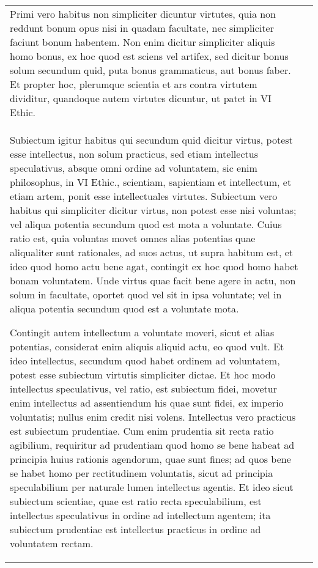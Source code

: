 \documentclass[10pt]{jsarticle}
\begin{document}
\begin{longtable}{p{21em}p{21em}}
\\

Primi vero habitus non simpliciter
dicuntur virtutes, quia non reddunt bonum opus nisi in quadam
facultate, nec simpliciter faciunt bonum habentem. Non enim dicitur
simpliciter aliquis homo bonus, ex hoc quod est sciens vel artifex,
sed dicitur bonus solum secundum quid, puta bonus grammaticus, aut
bonus faber. Et propter hoc, plerumque scientia et ars contra virtutem
dividitur, quandoque autem virtutes dicuntur, ut patet in VI
Ethic. 

&


\\


Subiectum igitur habitus qui secundum quid dicitur virtus, potest esse
intellectus, non solum practicus, sed etiam intellectus speculativus,
absque omni ordine ad voluntatem, sic enim philosophus, in VI Ethic.,
scientiam, sapientiam et intellectum, et etiam artem, ponit esse
intellectuales virtutes. Subiectum vero habitus qui simpliciter
dicitur virtus, non potest esse nisi voluntas; vel aliqua potentia
secundum quod est mota a voluntate. Cuius ratio est, quia voluntas
movet omnes alias potentias quae aliqualiter sunt rationales, ad suos
actus, ut supra habitum est, et ideo quod homo actu bene agat,
contingit ex hoc quod homo habet bonam voluntatem. Unde virtus quae
facit bene agere in actu, non solum in facultate, oportet quod vel sit
in ipsa voluntate; vel in aliqua potentia secundum quod est a
voluntate mota.


Contingit autem intellectum a voluntate moveri, sicut
et alias potentias, considerat enim aliquis aliquid actu, eo quod
vult. Et ideo intellectus, secundum quod habet ordinem ad voluntatem,
potest esse subiectum virtutis simpliciter dictae. Et hoc modo
intellectus speculativus, vel ratio, est subiectum fidei, movetur enim
intellectus ad assentiendum his quae sunt fidei, ex imperio
voluntatis; nullus enim credit nisi volens. Intellectus vero practicus
est subiectum prudentiae. Cum enim prudentia sit recta ratio
agibilium, requiritur ad prudentiam quod homo se bene habeat ad
principia huius rationis agendorum, quae sunt fines; ad quos bene se
habet homo per rectitudinem voluntatis, sicut ad principia
speculabilium per naturale lumen intellectus agentis. Et ideo sicut
subiectum scientiae, quae est ratio recta speculabilium, est
intellectus speculativus in ordine ad intellectum agentem; ita
subiectum prudentiae est intellectus practicus in ordine ad voluntatem
rectam.


&


\end{longtable}
\end{document}
